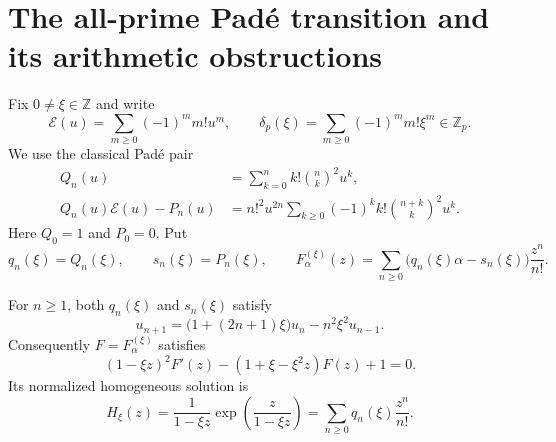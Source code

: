 
\section{The all-prime Pad\'e transition and its arithmetic obstructions}
\label{sec:all-prime-pade}

Fix $0\ne\xi\in\mathbb Z$ and write
\[
 \mathcal E(u)=\sum_{m\geq0}(-1)^m m!u^m,
 \qquad
 \delta_p(\xi)=\sum_{m\geq0}(-1)^m m!\xi^m\in\mathbb Z_p.
\]
We use the classical Pad\'e pair~\cite{MZ2018}
\begin{align}
 Q_n(u)&=\sum_{k=0}^n k!\binom nk^2u^k,\label{eq:Qn-def}\\
 Q_n(u)\mathcal E(u)-P_n(u)
 &=n!^2u^{2n}\sum_{k\geq0}(-1)^k k!
       \binom{n+k}{k}^2u^k.\label{eq:pade-rem}
\end{align}
Here $Q_0=1$ and $P_0=0$.  Put
\[
 q_n(\xi)=Q_n(\xi),\qquad s_n(\xi)=P_n(\xi),\qquad
 F_{\alpha}^{(\xi)}(z)
 =\sum_{n\geq0}\bigl(q_n(\xi)\alpha-s_n(\xi)\bigr)\frac{z^n}{n!}.
\]

\begin{lemma}
\label{lem:pade-recurrence-all-prime}
For $n\geq1$, both $q_n(\xi)$ and $s_n(\xi)$ satisfy
\begin{equation}
 u_{n+1}=\bigl(1+(2n+1)\xi\bigr)u_n-n^2\xi^2u_{n-1}.
\label{eq:pade-three-term-xi}
\end{equation}
Consequently $F=F_\alpha^{(\xi)}$ satisfies
\begin{equation}
 (1-\xi z)^2F'(z)-(1+\xi-\xi^2z)F(z)+1=0.
\label{eq:affine-pade-ode}
\end{equation}
Its normalized homogeneous solution is
\begin{equation}
 H_\xi(z)=\frac{1}{1-\xi z}
 \exp\!\left(\frac{z}{1-\xi z}\right)
 =\sum_{n\geq0}q_n(\xi)\frac{z^n}{n!}.
\label{eq:H-xi}
\end{equation}
\end{lemma}

